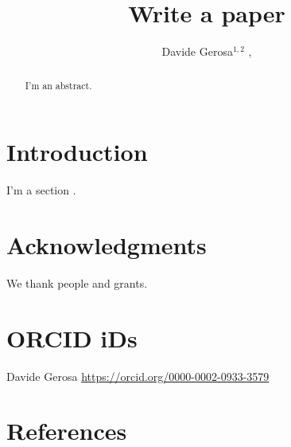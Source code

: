 \documentclass[]{iopart}
\newcommand{\milan}{{Dipartimento di Fisica ``G. Occhialini'', Universit\`a degli Studi di Milano-Bicocca, Piazza della Scienza 3, 20126 Milano, Italy}}
\newcommand{\infn}{{INFN, Sezione di Milano-Bicocca, Piazza della Scienza 3, 20126 Milano, Italy}}
\begin{document}
\begin{center}
\title[D.~Gerosa et al.]{Write a paper}
\end{center}

\author{
Davide Gerosa$^{1,2}$ ,
}
\vspace{0.1cm}
\address{$^{1}$~\milan}
\address{$^{2}$~\infn}


\setcounter{footnote}{0}


\begin{abstract}
I'm an abstract. 
\end{abstract}


\section{Introduction}

I'm a section \cite{2016PhRvL.116f1102A}.



\section*{Acknowledgments}

We thank people and grants.

\section*{ORCID iDs}
Davide Gerosa  \href{https://orcid.org/0000-0002-0933-3579}{https://orcid.org/0000-0002-0933-3579} \\


\section*{References}


\end{document}
